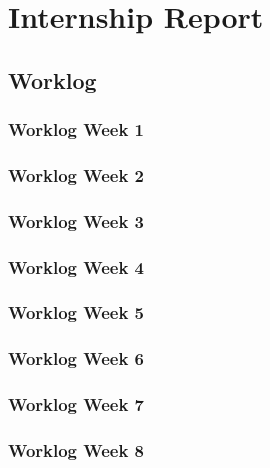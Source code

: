 \providecommand{\tightlist}{%
  \setlength{\itemsep}{0pt}\setlength{\parskip}{0pt}%
}

\section{Internship Report}

\subsection{Worklog}

\subsubsection{Worklog Week 1}


\subsubsection{Worklog Week 2}


\subsubsection{Worklog Week 3}


\subsubsection{Worklog Week 4}


\subsubsection{Worklog Week 5}


\subsubsection{Worklog Week 6}


\subsubsection{Worklog Week 7}


\subsubsection{Worklog Week 8}


